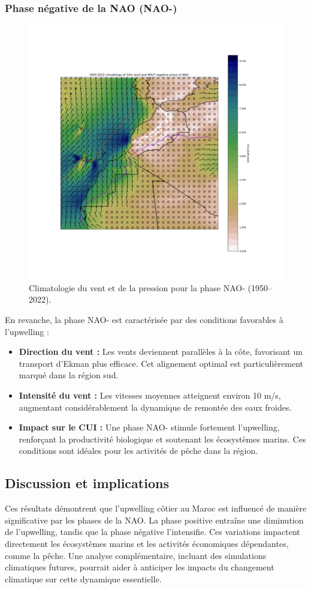 \subsubsection{Phase négative de la NAO (NAO-)}
\begin{figure}[H]
\centering
\includegraphics[scale=0.3]{NEG_PHASE.png}
\caption{Climatologie du vent et de la pression pour la phase NAO- (1950–2022).}
\label{fig:nao_negative}
\end{figure}

En revanche, la phase NAO- est caractérisée par des conditions favorables à l’upwelling :
\begin{itemize}
    \item \textbf{Direction du vent :} Les vents deviennent parallèles à la côte, favorisant un transport d'Ekman plus efficace. Cet alignement optimal est particulièrement marqué dans la région sud.
    \item \textbf{Intensité du vent :} Les vitesses moyennes atteignent environ 10 m/s, augmentant considérablement la dynamique de remontée des eaux froides.
    \item \textbf{Impact sur le CUI :} Une phase NAO- stimule fortement l’upwelling, renforçant la productivité biologique et soutenant les écosystèmes marins. Ces conditions sont idéales pour les activités de pêche dans la région.
\end{itemize}

\subsection{Discussion et implications}
Ces résultats démontrent que l'upwelling côtier au Maroc est influencé de manière significative par les phases de la NAO. La phase positive entraîne une diminution de l’upwelling, tandis que la phase négative l’intensifie. Ces variations impactent directement les écosystèmes marins et les activités économiques dépendantes, comme la pêche. Une analyse complémentaire, incluant des simulations climatiques futures, pourrait aider à anticiper les impacts du changement climatique sur cette dynamique essentielle.
